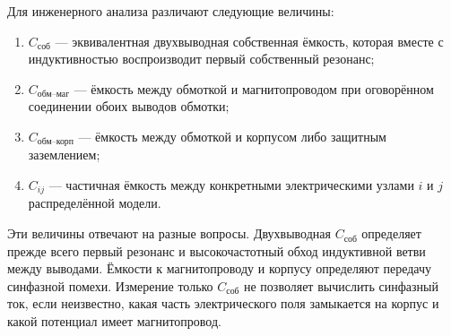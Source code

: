 \documentclass[14pt,a4paper]{extarticle}
\begin{document}
Для инженерного анализа различают следующие величины:
\begin{enumerate}
\item $C_{\text{соб}}$ --- эквивалентная двухвыводная собственная ёмкость,
которая вместе с индуктивностью воспроизводит первый собственный резонанс;
\item $C_{\text{обм--маг}}$ --- ёмкость между обмоткой и магнитопроводом при
оговорённом соединении обоих выводов обмотки;
\item $C_{\text{обм--корп}}$ --- ёмкость между обмоткой и корпусом либо
защитным заземлением;
\item $C_{ij}$ --- частичная ёмкость между конкретными электрическими узлами
$i$ и $j$ распределённой модели.
\end{enumerate}

Эти величины отвечают на разные вопросы. Двухвыводная $C_{\text{соб}}$
определяет прежде всего первый резонанс и высокочастотный обход индуктивной
ветви между выводами. Ёмкости к магнитопроводу и корпусу определяют передачу
синфазной помехи. Измерение только $C_{\text{соб}}$ не позволяет вычислить
синфазный ток, если неизвестно, какая часть электрического поля замыкается на
корпус и какой потенциал имеет магнитопровод.
\end{document}
